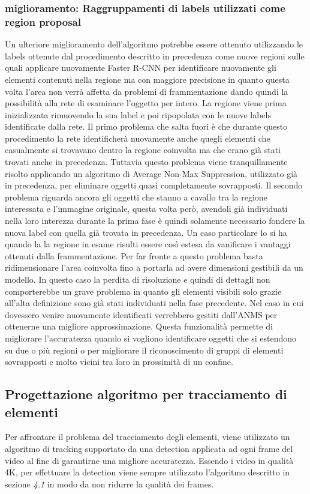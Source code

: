 \subsubsection{miglioramento: Raggruppamenti di labels utilizzati come region proposal}
Un ulteriore miglioramento dell'algoritmo potrebbe essere ottenuto utilizzando le labels ottenute dal procedimento descritto in precedenza come nuove regioni sulle quali applicare nuovamente Faster R-CNN per identificare nuovamente gli elementi contenuti nella regione ma con maggiore precisione in quanto questa volta l'area non verrà affetta da problemi di frammentazione dando quindi la possibilità alla rete di esaminare l'oggetto per intero. La regione viene prima inizializzata rimuovendo la sua label e poi ripopolata con le nuove labels identificate dalla rete.
Il primo problema che salta fuori è che durante questo procedimento la rete identificherà nuovamente anche quegli elementi che casualmente si trovavano dentro la regione coinvolta ma che erano già stati trovati anche in precedenza. Tuttavia questo problema viene tranquillamente risolto applicando un algoritmo di Average Non-Max Suppression, utilizzato già in precedenza, per eliminare oggetti quasi completamente sovrapposti. Il secondo problema riguarda ancora gli oggetti che stanno a cavallo tra la regione interessata e l'immagine originale, questa volta però, avendoli già individuati nella loro interezza durante la prima fase è quindi solamente necessario fondere la nuova label con quella già trovata in precedenza. 
Un caso particolare lo si ha quando la la regione in esame risulti essere così estesa da vanificare i vantaggi ottenuti dalla frammentazione. Per far fronte a questo problema basta ridimensionare l'area coinvolta fino a portarla ad avere dimensioni gestibili da un modello. In questo caso la perdita di risoluzione e quindi di dettagli non comporterebbe un grave problema in quanto gli elementi visibili solo grazie all'alta definizione sono già stati individuati nella fase precedente. Nel caso in cui dovessero venire nuovamente identificati verrebbero gestiti dall'ANMS per ottenerne una migliore approssimazione. Questa funzionalità permette di migliorare l'accuratezza quando si vogliono identificare oggetti che si estendono su due o più regioni o per migliorare il riconoscimento di gruppi di elementi sovrapposti e molto vicini tra loro in prossimità di un confine.
\subsection{Progettazione algoritmo per tracciamento di elementi}
Per affrontare il problema del tracciamento degli elementi, viene utilizzato un algoritmo di tracking supportato da una detection applicata ad ogni frame del video al fine di garantirne una migliore accuratezza. Essendo i video in  qualità 4K, per effettuare la detection viene sempre utilizzato l'algoritmo descritto in sezione \textit{4.1} in modo da non ridurre la qualità dei frames.

